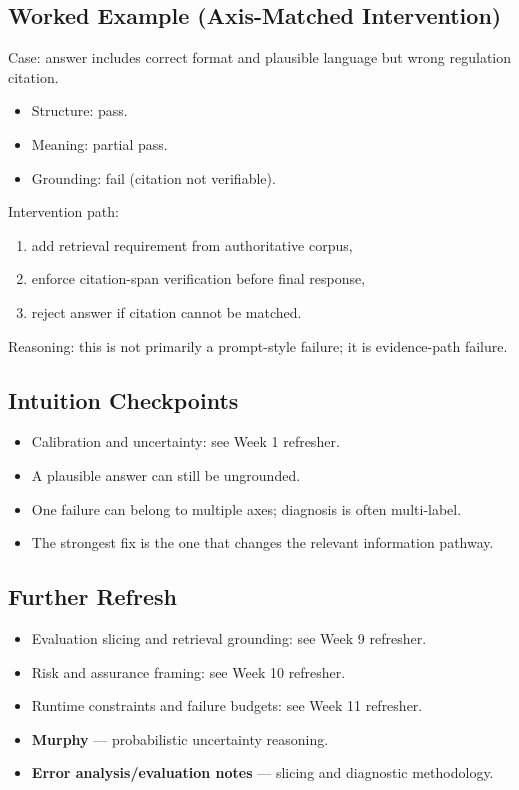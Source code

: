 \subsection*{Worked Example (Axis-Matched Intervention)}
Case: answer includes correct format and plausible language but wrong regulation citation.
\begin{itemize}[leftmargin=1.5em]
  \item Structure: pass.
  \item Meaning: partial pass.
  \item Grounding: fail (citation not verifiable).
\end{itemize}
Intervention path:
\begin{enumerate}[leftmargin=1.5em]
  \item add retrieval requirement from authoritative corpus,
  \item enforce citation-span verification before final response,
  \item reject answer if citation cannot be matched.
\end{enumerate}
Reasoning: this is not primarily a prompt-style failure; it is evidence-path failure.

\subsection*{Intuition Checkpoints}
\begin{itemize}[leftmargin=1.5em]
  \item Calibration and uncertainty: see Week 1 refresher.
  \item A plausible answer can still be ungrounded.
  \item One failure can belong to multiple axes; diagnosis is often multi-label.
  \item The strongest fix is the one that changes the relevant information pathway.
\end{itemize}

\subsection*{Further Refresh}
\begin{itemize}[leftmargin=1.5em]
  \item Evaluation slicing and retrieval grounding: see Week 9 refresher.
  \item Risk and assurance framing: see Week 10 refresher.
  \item Runtime constraints and failure budgets: see Week 11 refresher.
  \item \textbf{Murphy} --- probabilistic uncertainty reasoning.
  \item \textbf{Error analysis/evaluation notes} --- slicing and diagnostic methodology.
\end{itemize}
